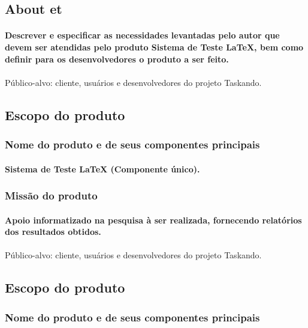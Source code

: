 \documentclass{article}
\begin{document}
	\subsection{About et}
		\paragraph{Descrever e especificar as necessidades levantadas pelo autor que devem ser atendidas pelo produto Sistema de Teste LaTeX, bem como definir para os desenvolvedores o produto a ser feito.}

\paragraph{}Público-alvo: cliente, usuários e desenvolvedores do projeto Taskando.
	\subsection{Escopo do produto}
		\subsubsection{Nome do produto e de seus componentes principais}
			\paragraph{Sistema de Teste LaTeX (Componente único). }
		\subsubsection{Missão do produto}
			\paragraph{Apoio informatizado na pesquisa à ser realizada, fornecendo relatórios dos resultados obtidos.}
			
\paragraph{}Público-alvo: cliente, usuários e desenvolvedores do projeto Taskando.
	\subsection{Escopo do produto}
		\subsubsection{Nome do produto e de seus componentes principais}
\end{document}

